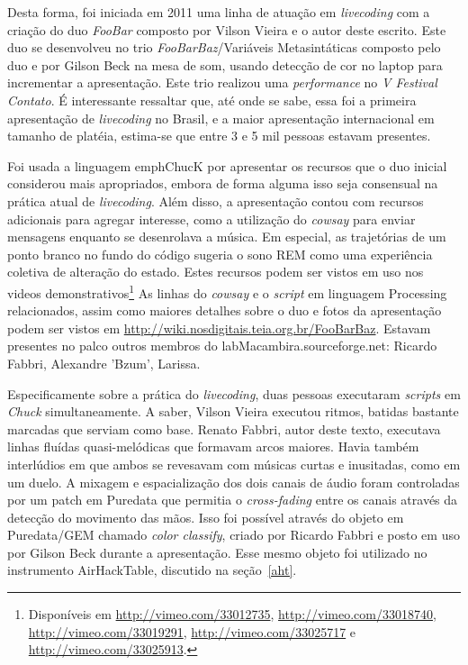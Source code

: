 Desta forma, foi iniciada em 2011 uma linha de atuação em \emph{livecoding} com
a criação do duo \emph{FooBar} composto por Vilson Vieira e o autor
deste escrito. Este duo se desenvolveu no
trio \emph{FooBarBaz}/Variáveis Metasintáticas composto
pelo duo e por Gilson Beck na mesa de som, usando detecção de cor no laptop
para incrementar a apresentação. Este trio
realizou uma \emph{performance} no \emph{V Festival Contato}.
 É interessante ressaltar que, até onde se sabe,
essa foi a primeira apresentação de \emph{livecoding} no Brasil, e a maior
apresentação internacional em tamanho de platéia, estima-se que entre 3 e 5 mil
pessoas estavam presentes.

Foi usada a linguagem emph{ChucK} por apresentar os recursos que
o duo inicial considerou mais apropriados,
 embora de forma alguma isso seja
consensual na prática atual de \emph{livecoding}. Além disso, a apresentação
contou com recursos adicionais para agregar interesse, como a
utilização do \emph{cowsay} para enviar mensagens enquanto se
desenrolava a música. Em especial, as trajetórias de um ponto branco
no fundo do código sugeria o sono REM como uma experiência coletiva de alteração
do estado.
Estes recursos podem ser vistos
em uso nos videos demonstrativos\footnote{Disponíveis em
  \url{http://vimeo.com/33012735}, \url{http://vimeo.com/33018740},
  \url{http://vimeo.com/33019291}, \url{http://vimeo.com/33025717} e
  \url{http://vimeo.com/33025913}.}
  As linhas do \emph{cowsay} e o
\emph{script} em linguagem Processing relacionados, assim como maiores
detalhes sobre o duo e fotos da apresentação podem ser vistos em
\url{http://wiki.nosdigitais.teia.org.br/FooBarBaz}. Estavam presentes
no palco outros membros do labMacambira.sourceforge.net: Ricardo Fabbri,
Alexandre 'Bzum', Larissa.

Especificamente sobre a prática do \emph{livecoding},
duas pessoas executaram \emph{scripts} em \emph{Chuck} simultaneamente.
A saber, Vilson
Vieira executou ritmos, batidas bastante marcadas que serviam como
base. Renato Fabbri, autor deste texto, executava linhas
fluídas quasi-melódicas que formavam arcos maiores.
Havia também interlúdios em que ambos se
revesavam com músicas curtas e inusitadas, como em um duelo. A mixagem
e espacialização dos dois canais de áudio foram controladas por um
patch em Puredata que permitia o \textit{cross-fading} entre os canais
através da detecção do movimento das mãos. Isso foi possível através
do objeto em Puredata/GEM chamado \emph{color classify}, criado por
Ricardo Fabbri e posto em uso por Gilson Beck durante a
apresentação. Esse mesmo objeto foi utilizado no instrumento
AirHackTable, discutido na seção~\ref{aht}.


